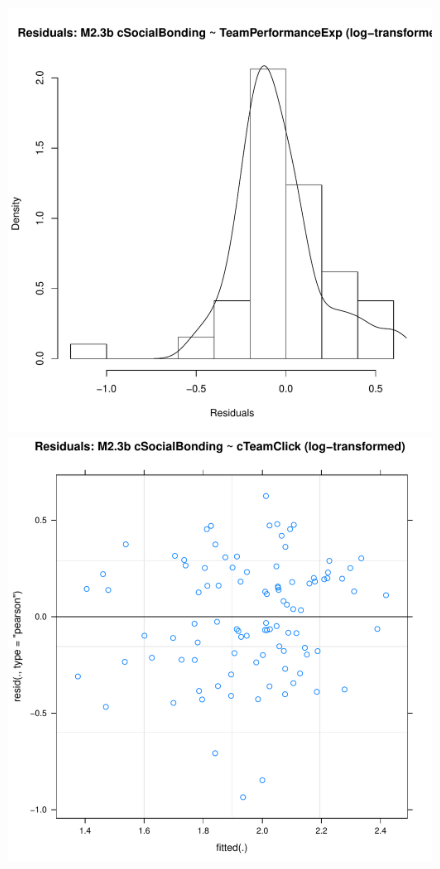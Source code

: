       \begin{figure}[htbp]
        \includegraphics[scale =.4]{images/MLM23bLogHist.pdf}
        \includegraphics[scale =.4]{images/MLM23bLogScatter.pdf}

\end{figure}
